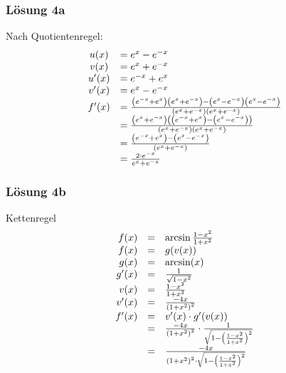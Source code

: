 \documentclass[main.tex]{subfiles}
\begin{document}

\subsubsection{Lösung 4a}
Nach Quotientenregel:
\begin{equation*}
    \begin{array}{ c l }
    u( x) & =e^{x} -e^{-x}\\
    v( x) & =e^{x} +e^{-x}\\
    u'( x) & =e^{-x} +e^{x}\\
    v'( x) & =e^{x} -e^{-x}\\
    f'( x) & =\frac{\left( e^{-x} +e^{x}\right)\left( e^{x} +e^{-x}\right) -\left( e^{x} -e^{-x}\right)\left( e^{x} -e^{-x}\right)}{\left( e^{x} +e^{-x}\right)\left( e^{x} +e^{-x}\right)}\\
    & =\frac{\left( e^{x} +e^{-x}\right)\left(\left( e^{-x} +e^{x}\right) -\left( e^{x} -e^{-x}\right)\right)}{\left( e^{x} +e^{-x}\right)\left( e^{x} +e^{-x}\right)}\\
    & =\frac{\left( e^{-x} +e^{x}\right) -\left( e^{x} -e^{-x}\right)}{\left( e^{x} +e^{-x}\right)}\\
    & =\frac{2\cdotp e^{-x}}{e^{x} +e^{-x}}
    \end{array}
\end{equation*}

\subsubsection{Lösung 4b}
Kettenregel
\begin{equation*}
    \begin{array}{ r c l }
    f( x) & = & \arcsin\frac{1-x^{2}}{1+x^{2}}\\
    f( x) & = & g( v( x))\\
    g( x) & = & \arcsin( x)\\
    g'( x) & = & \frac{1}{\sqrt{1-x^{2}}}\\
    v( x) & = & \frac{1-x^{2}}{1+x^{2}}\\
    v'( x) & = & \frac{-4x}{\left( 1+x^{2}\right)^{2}}\\
    f'( x) & = & v'( x) \cdotp g'( v( x))\\
    & = & \frac{-4x}{\left( 1+x^{2}\right)^{2}} \cdotp \frac{1}{\sqrt{1-\left(\frac{1-x^{2}}{1+x^{2}}\right)^{2}}}\\
    & = & \frac{-4x}{\left( 1+x^{2}\right)^{2} \cdotp \sqrt{1-\left(\frac{1-x^{2}}{1+x^{2}}\right)^{2}}}
    \end{array}
\end{equation*}
\end{document}
